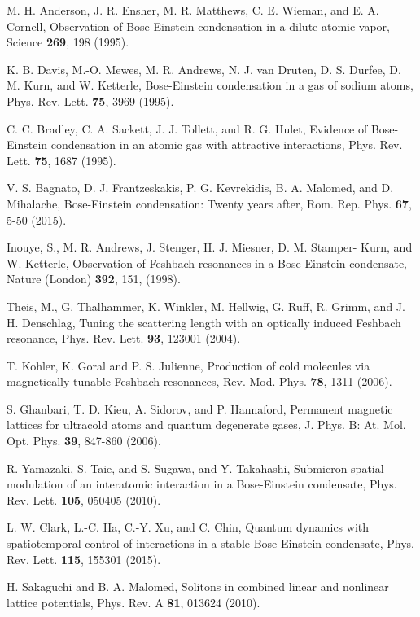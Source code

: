 \documentclass[aps,preprint,showkeys,
]{revtex4}
\begin{document}
\begin{thebibliography}{99}
 M. H. Anderson, J. R. Ensher, M. R. Matthews, C. E.
Wieman, and E. A. Cornell, Observation of Bose-Einstein condensation in a
dilute atomic vapor, Science \textbf{269}, 198 (1995).

 K. B. Davis, M.-O. Mewes, M. R. Andrews, N. J. van
Druten, D. S. Durfee, D. M. Kurn, and W. Ketterle, Bose-Einstein
condensation in a gas of sodium atoms, Phys. Rev. Lett. \textbf{75}, 3969
(1995).

 C. C. Bradley, C. A. Sackett, J. J. Tollett, and R. G.
Hulet, Evidence of Bose-Einstein condensation in an atomic gas with
attractive interactions, Phys. Rev. Lett. \textbf{75}, 1687 (1995).

 V. S. Bagnato, D. J. Frantzeskakis, P. G. Kevrekidis, B.
A. Malomed, and D. Mihalache, Bose-Einstein condensation: Twenty years
after, Rom. Rep. Phys. \textbf{67}, 5-50 (2015).

 Inouye, S., M. R. Andrews, J. Stenger, H. J. Miesner, D. M.
Stamper- Kurn, and W. Ketterle, Observation of Feshbach resonances in a
Bose-Einstein condensate, Nature (London) \textbf{392}, 151, (1998).

 Theis, M., G. Thalhammer, K. Winkler, M. Hellwig, G. Ruff, R.
Grimm, and J. H. Denschlag, Tuning the scattering length with an optically
induced Feshbach resonance, Phys. Rev. Lett. \textbf{93}, 123001 (2004).

 T. Kohler, K. Goral and P. S. Julienne, Production of cold
molecules via magnetically tunable Feshbach resonances, Rev. Mod. Phys.
\textbf{78}, 1311 (2006).

 S. Ghanbari, T. D. Kieu, A. Sidorov, and P. Hannaford,
Permanent magnetic lattices for ultracold atoms and quantum degenerate
gases, J. Phys. B: At. Mol. Opt. Phys. \textbf{39}, 847-860 (2006).

 R. Yamazaki, S. Taie, and S. Sugawa, and Y. Takahashi,
Submicron spatial modulation of an interatomic interaction in a
Bose-Einstein condensate, Phys. Rev. Lett. \textbf{105}, 050405 (2010).

 L. W. Clark, L.-C. Ha, C.-Y. Xu, and C. Chin, Quantum dynamics
with spatiotemporal control of interactions in a stable Bose-Einstein
condensate, Phys. Rev. Lett. \textbf{115}, 155301 (2015).

 H. Sakaguchi and B. A. Malomed, Solitons in combined linear and
nonlinear lattice potentials, Phys. Rev. A \textbf{81}, 013624 (2010).


\end{thebibliography}
\end{document}
